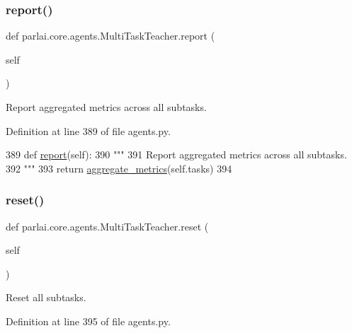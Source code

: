 \subsubsection{\texorpdfstring{report()}{report()}}
{\footnotesize\ttfamily def parlai.\+core.\+agents.\+Multi\+Task\+Teacher.\+report (\begin{DoxyParamCaption}\item[{}]{self }\end{DoxyParamCaption})}

\begin{DoxyVerb}Report aggregated metrics across all subtasks.
\end{DoxyVerb}
 

Definition at line 389 of file agents.\+py.


\begin{DoxyCode}
389     \textcolor{keyword}{def }\hyperlink{namespaceprojects_1_1convai2_1_1eval__f1_a01a47b9c08dad189837a51f085defc45}{report}(self):
390         \textcolor{stringliteral}{"""}
391 \textcolor{stringliteral}{        Report aggregated metrics across all subtasks.}
392 \textcolor{stringliteral}{        """}
393         \textcolor{keywordflow}{return} \hyperlink{namespaceparlai_1_1core_1_1metrics_aa4ed5491962e06684b235fffe1b20fec}{aggregate\_metrics}(self.tasks)
394 
\end{DoxyCode}
\mbox{\label{classparlai_1_1core_1_1agents_1_1MultiTaskTeacher_ae4eeda38c4164498018ee6515050ae43}} 
\subsubsection{\texorpdfstring{reset()}{reset()}}
{\footnotesize\ttfamily def parlai.\+core.\+agents.\+Multi\+Task\+Teacher.\+reset (\begin{DoxyParamCaption}\item[{}]{self }\end{DoxyParamCaption})}

\begin{DoxyVerb}Reset all subtasks.
\end{DoxyVerb}
 

Definition at line 395 of file agents.\+py.


